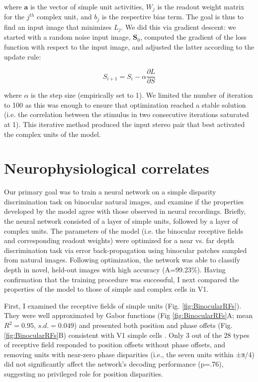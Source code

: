 where $\mathbf{a}$ is the vector of simple unit activities, $W_j$ is the readout weight matrix for the $j^{th}$ complex unit, and $b_j$ is the respective bias term. The goal is thus to find an input image that minimizes $L_j$. We did this via gradient descent: we started with a random noise input image, $\mathbf{S}_0$, computed the gradient of the loss function with respect to the input image, and adjusted the latter according to the update rule:

\begin{equation}
  S_{i+1} = S_i - \alpha \frac{\partial L}{\partial S}
\end{equation}

where $\alpha$ is the step size (empirically set to 1). We limited the number of iteration to 100 as this was enough to ensure that optimization reached a stable solution (i.e. the correlation between the stimulus in two consecutive iterations saturated at 1). This iterative method produced the input stereo pair that best activated the complex units of the model.

\clearpage
\section{Neurophysiological correlates} 

Our primary goal was to train a neural network on a simple disparity discrimination task on binocular natural images, and examine if the properties developed by the model agree with those observed in neural recordings. Briefly, the neural network consisted of a layer of simple units, followed by a layer of complex units. The parameters of the model (i.e. the binocular receptive fields and corresponding readout weights) were optimized for a near vs. far depth discrimination task via error back-propagation using binocular patches sampled from natural images. Following optimization, the network was able to classify depth in novel, held-out images with high accuracy (A=99.23\%). Having confirmation that the training procedure was successful, I next compared the properties of the model to those of simple and complex cells in V1. 

First, I examined the receptive fields of simple units (Fig. \ref{fig:BinocularRFs}). They were well approximated by Gabor functions (Fig \ref{fig:BinocularRFs}A; mean $R^2=0.95$, $s.d.=0.049$) and presented both position and phase offets (Fig. \ref{fig:BinocularRFs}B) consistent with V1 simple cells \cite{Ohzawa:1986af,DeAngelis:1991mb,Tsao:2003pi}. Only 3 out of the 28 types of receptive field responded to position offsets without phase offsets, and removing units with near-zero phase disparities (i.e., the seven units within ±π/4) did not significantly affect the network’s decoding performance (p=.76), suggesting no privileged role for position disparities.

